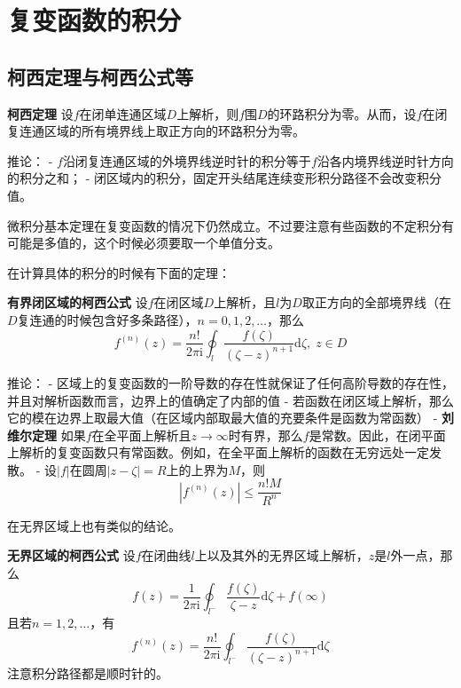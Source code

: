 \hypertarget{ux590dux53d8ux51fdux6570ux7684ux79efux5206}{%
\section{复变函数的积分}\label{ux590dux53d8ux51fdux6570ux7684ux79efux5206}}

\hypertarget{ux67efux897fux5b9aux7406ux4e0eux67efux897fux516cux5f0fux7b49}{%
\subsection{柯西定理与柯西公式等}\label{ux67efux897fux5b9aux7406ux4e0eux67efux897fux516cux5f0fux7b49}}

\textbf{柯西定理}
设\(f\)在闭单连通区域\(D\)上解析，则\(f\)围\(D\)的环路积分为零。从而，设\(f\)在闭复连通区域的所有境界线上取正方向的环路积分为零。

推论： -
\(f\)沿闭复连通区域的外境界线逆时针的积分等于\(f\)沿各内境界线逆时针方向的积分之和；
- 闭区域内的积分，固定开头结尾连续变形积分路径不会改变积分值。

微积分基本定理在复变函数的情况下仍然成立。不过要注意有些函数的不定积分有可能是多值的，这个时候必须要取一个单值分支。

在计算具体的积分的时候有下面的定理：

\textbf{有界闭区域的柯西公式}
设\(f\)在闭区域\(D\)上解析，且\(l\)为\(D\)取正方向的全部境界线（在\(D\)复连通的时候包含好多条路径），\(n=0, 1, 2, \ldots\)，那么
\[
f^{(n)}(z) = \frac{n!}{2\pi \mathrm{i}} \oint_l \frac{f(\zeta)}{(\zeta - z)^{n+1}} \mathrm{d}\zeta, \; z \in D
\]

推论： -
区域上的复变函数的一阶导数的存在性就保证了任何高阶导数的存在性，并且对解析函数而言，边界上的值确定了内部的值
-
若函数在闭区域上解析，那么它的模在边界上取最大值（在区域内部取最大值的充要条件是函数为常函数）
- \textbf{刘维尔定理}
如果\(f\)在全平面上解析且\(z \rightarrow \infty\)时有界，那么\(f\)是常数。因此，在闭平面上解析的复变函数只有常函数。例如，在全平面上解析的函数在无穷远处一定发散。
- 设\(|f|\)在圆周\(|z-\zeta|=R\)上的上界为\(M\)，则 \[
  |f^{(n)}(z)| \leq \frac{n! M}{R^n}
  \]

在无界区域上也有类似的结论。

\textbf{无界区域的柯西公式}
设\(f\)在闭曲线\(l\)上以及其外的无界区域上解析，\(z\)是\(l\)外一点，那么
\[
f(z) = \frac{1}{2\pi \mathrm{i}} \oint_{l^-} \frac{f(\zeta)}{\zeta - z} \mathrm{d}\zeta + f(\infty  )
\] 且若\(n=1, 2, \ldots\)，有 \[
f^{(n)}(z) = \frac{n!}{2 \pi \mathrm{i}} \oint_{l^-} \frac{f(\zeta)}{(\zeta - z)^{n+1}}\mathrm{d}\zeta
\] 注意积分路径都是顺时针的。

